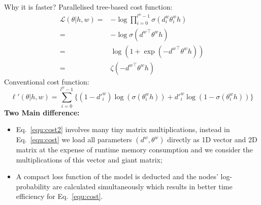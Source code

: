 \documentclass[final,t,unknownkeysallowed]{beamer}
\begin{document}
\begin{frame}{}
\begin{columns}[t]
\begin{column}{.3\linewidth}
	\begin{block}{Why it is faster?}
Parallelised tree-based cost function:
    \begin{equation}\label{equ:cost}
\begin{split}
   \mathcal{L}(\theta|h,w) =&-\log\prod_{i=0}^{l^w -1} \sigma(d_i^w \theta_{i}^w h) \\
    =& -\log \sigma({d^w}^\top \theta^w h)\\
    =& \log (1+\exp(- {d^w}^\top \theta^w h )) \\
    =&  \zeta(- {d^w}^\top \theta^w h )
\end{split}
\end{equation}
    Conventional cost function:
    \begin{equation}\label{equ:cost2}
    \ell'(\theta|h,w) =\sum_{i=0}^{l^w-1} \{(1-d'^w_i)\log (\sigma(\theta_{i}^w h))  + {d'^w_i}\log (1-\sigma (\theta_{i}^w h))\}
    \end{equation}
    \textbf{Two Main difference:}
	\begin{itemize}
	\item Eq.~\ref{equ:cost2} involves many tiny matrix multiplications, instead in Eq.~\ref{equ:cost} we load all parameters $(d^w, \theta^w)$ directly as 1D vector and 2D matrix at the expense of runtime memory consumption and we consider the multiplications of this vector and giant matrix;
    \item A compact loss function of the model is deducted and the nodes' log-probability are calculated simultaneously which results in better time efficiency for Eq.~\ref{equ:cost}.
	\end{itemize}
      \end{block}
     

\end{column}
\end{columns}
\end{frame}
\end{document}
